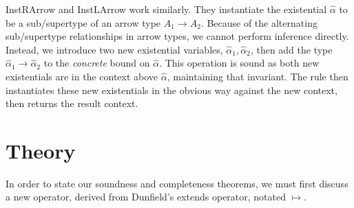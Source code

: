 \documentclass{sig-alternate}
\newcommand{\alphahat}{\hat{\alpha}}
\begin{document}
InstRArrow and InstLArrow work similarly. They instantiate the existential $\alphahat$ to be a sub/supertype of an arrow type $A_1 \rightarrow A_2$. Because of the alternating sub/supertype relationships in arrow types, we cannot perform inference directly. Instead, we introduce two new existential variables, $\alphahat_1, \alphahat_2$, then add the type $\alphahat_1\rightarrow\alphahat_2$ to the \emph{concrete} bound on $\alphahat$. This operation is sound as both new existentials are in the context above $\alphahat$, maintaining that invariant. The rule then instantiates these new existentials in the obvious way against the new context, then returns the result context. 

\section{Theory}
In order to state our soundness and completeness theorems, we must first discuss a new operator, derived from Dunfield's extends operator, notated $\mapsto$. 




\end{document}
